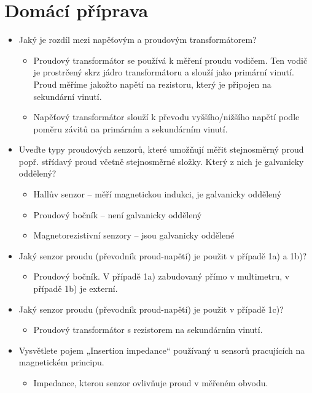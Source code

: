 \documentclass[a4paper,12pt]{article}
\begin{document}
\section{Domácí příprava}
\begin{itemize}
  \item Jaký je rozdíl mezi napěťovým a proudovým transformátorem?
    \begin{itemize}
      \item Proudový transformátor se používá k měření proudu vodičem. Ten vodič je prostrčený skrz jádro transformátoru a slouží jako primární vinutí. Proud měříme jakožto napětí na rezistoru, který je připojen na sekundární vinutí.
      \item Napěťový transformátor slouží k převodu vyššího/nižšího napětí podle poměru závitů na primárním a sekundárním vinutí.
    \end{itemize}
  \item Uveďte typy proudových senzorů, které umožňují měřit stejnosměrný proud popř. střídavý proud včetně stejnosměrné složky. Který z nich je galvanicky oddělený?
    \begin{itemize}
      \item Hallův senzor -- měří magnetickou indukci, je galvanicky oddělený
      \item Proudový bočník -- není galvanicky oddělený
      \item Magnetorezistivní senzory -- jsou galvanicky oddělené
    \end{itemize}
  \item Jaký senzor proudu (převodník proud-napětí) je použit v případě 1a) a 1b)?
    \begin{itemize}
      \item Proudový bočník. V případě 1a) zabudovaný přímo v multimetru, v případě 1b) je externí.
    \end{itemize}
  \item Jaký senzor proudu (převodník proud-napětí) je použit v případě 1c)?
    \begin{itemize}
      \item Proudový transformátor s rezistorem na sekundárním vinutí.
    \end{itemize}
  \item Vysvětlete pojem „Insertion impedance“ používaný u sensorů pracujících na magnetickém principu.
    \begin{itemize}
      \item Impedance, kterou senzor ovlivňuje proud v měřeném obvodu.
    \end{itemize}

\end{itemize}
\end{document}
